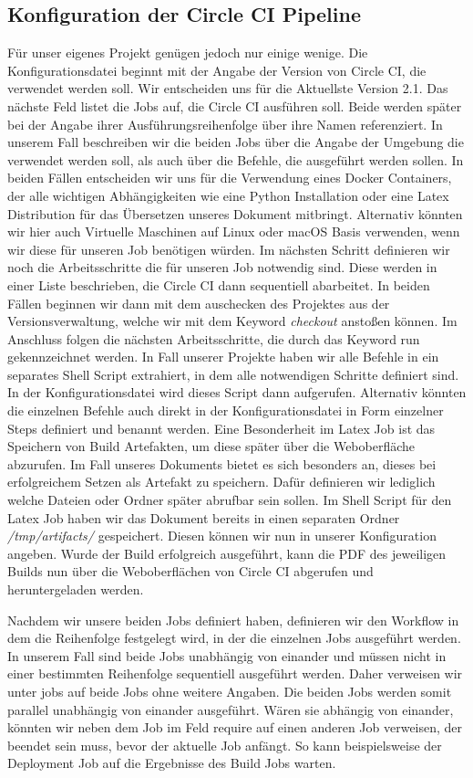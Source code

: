 \documentclass[11pt]{article}
\begin{document}
\subsection{Konfiguration der Circle CI Pipeline}
Für unser eigenes Projekt genügen jedoch nur einige wenige. Die Konfigurationsdatei beginnt mit der Angabe der Version von Circle CI, die verwendet werden soll. Wir entscheiden uns für die Aktuellste Version 2.1. Das nächste Feld listet die Jobs auf, die Circle CI ausführen soll. Beide werden später bei der Angabe ihrer Ausführungsreihenfolge über ihre Namen referenziert. In unserem Fall beschreiben wir die beiden Jobs über die Angabe der Umgebung die verwendet werden soll, als auch über die Befehle, die ausgeführt werden sollen. In beiden Fällen entscheiden wir uns für die Verwendung eines Docker Containers, der alle wichtigen Abhängigkeiten wie eine Python Installation oder eine Latex Distribution für das Übersetzen unseres Dokument mitbringt. Alternativ könnten wir hier auch Virtuelle Maschinen auf Linux oder macOS Basis verwenden, wenn wir diese für unseren Job benötigen würden.
Im nächsten Schritt definieren wir noch die Arbeitsschritte die für unseren Job notwendig sind. Diese werden in einer Liste beschrieben, die Circle CI dann sequentiell abarbeitet. In beiden Fällen beginnen wir dann mit dem auschecken des Projektes aus der Versionsverwaltung, welche wir mit dem Keyword \textit{checkout} anstoßen können. Im Anschluss folgen die nächsten Arbeitsschritte, die durch das Keyword run gekennzeichnet werden. In Fall unserer Projekte haben wir alle Befehle in ein separates Shell Script extrahiert, in dem alle notwendigen Schritte definiert sind. In der Konfigurationsdatei wird dieses Script dann aufgerufen. Alternativ könnten die einzelnen Befehle auch direkt in der Konfigurationsdatei in Form einzelner Steps definiert und benannt werden.
Eine Besonderheit im Latex Job ist das Speichern von Build Artefakten, um diese später über die Weboberfläche abzurufen. Im Fall unseres Dokuments bietet es sich besonders an, dieses bei erfolgreichem Setzen als Artefakt zu speichern. Dafür definieren wir lediglich welche Dateien oder Ordner später abrufbar sein sollen. Im Shell Script für den Latex Job haben wir das Dokument bereits in einen separaten Ordner \textit{/tmp/artifacts/} gespeichert. Diesen können wir nun in unserer Konfiguration angeben. Wurde der Build erfolgreich ausgeführt, kann die PDF des jeweiligen Builds nun über die Weboberflächen von Circle CI abgerufen und heruntergeladen werden.

Nachdem wir unsere beiden Jobs definiert haben, definieren wir den Workflow in dem die Reihenfolge festgelegt wird, in der die einzelnen Jobs ausgeführt werden. In unserem Fall sind beide Jobs unabhängig von einander und müssen nicht in einer bestimmten Reihenfolge sequentiell ausgeführt werden. Daher verweisen wir unter jobs auf beide Jobs ohne weitere Angaben. Die beiden Jobs werden somit parallel unabhängig von einander ausgeführt. Wären sie abhängig von einander, könnten wir neben dem Job im Feld require auf einen anderen Job verweisen, der beendet sein muss, bevor der aktuelle Job anfängt. So kann beispielsweise der Deployment Job auf die Ergebnisse des Build Jobs warten.
\end{document}
